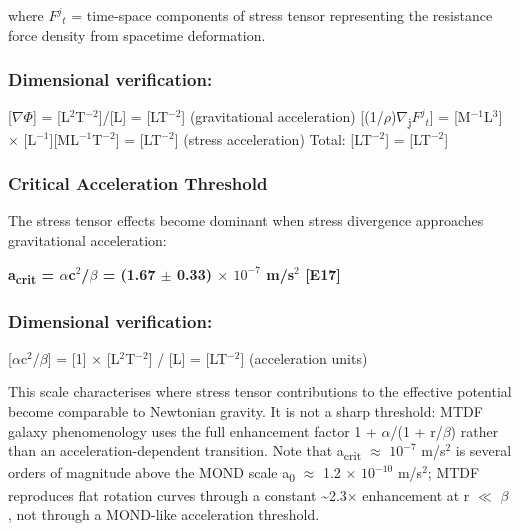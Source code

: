 \documentclass[11pt,a4paper]{article}
\begin{document}
where $F^{j}{}_{t}$ = time-space components of stress tensor representing the resistance force density from spacetime deformation.

\begin{mdframed}[linecolor=accent,linewidth=0.5pt,backgroundcolor=callout-bg,leftline=true,rightline=true,topline=true,bottomline=true,innerleftmargin=8pt,innerrightmargin=8pt,innertopmargin=6pt,innerbottommargin=6pt]
\subsubsection{Dimensional verification:}
[$\nabla$$\Phi$] = [L$^{2}$T$^{-2}$]/[L] = [LT$^{-2}$] (gravitational acceleration)\newline{}
[(1/\allowbreak{}$\rho$)$\nabla$\textsubscript{j}$F^{j}{}_{t}$] = [M$^{-1}$L$^{3}$] $\times$ [L$^{-1}$][ML$^{-1}$T$^{-2}$] = [LT$^{-2}$] (stress acceleration)\newline{}
Total: [LT$^{-2}$] = [LT$^{-2}$] \checkmark{}
\end{mdframed}

\subsubsection{Critical Acceleration Threshold}
The stress tensor effects become dominant when stress divergence approaches gravitational acceleration:

\textbf{a\textsubscript{crit} = $\alpha$c$^{2}$/$\beta$ = (1.67 $\pm$ 0.33) $\times$ $10^{-7}$ m/\allowbreak{}s$^{2}$ [E17]}

\begin{mdframed}[linecolor=accent,linewidth=0.5pt,backgroundcolor=callout-bg,leftline=true,rightline=true,topline=true,bottomline=true,innerleftmargin=8pt,innerrightmargin=8pt,innertopmargin=6pt,innerbottommargin=6pt]
\subsubsection{Dimensional verification:}
[$\alpha$c$^{2}$/$\beta$] = [1] $\times$ [L$^{2}$T$^{-2}$] / [L] = [LT$^{-2}$] \checkmark{} (acceleration units)
\end{mdframed}

This scale characterises where stress tensor contributions to the effective potential become comparable to Newtonian gravity. It is not a sharp threshold: MTDF galaxy phenomenology uses the full enhancement factor 1 + $\alpha$/(1 + r/\allowbreak{}$\beta$) rather than an acceleration-dependent transition. Note that a\textsubscript{crit} $\approx$ $10^{-7}$ m/\allowbreak{}s$^{2}$ is several orders of magnitude above the MOND scale a\textsubscript{0} $\approx$ 1.2 $\times$ $10^{-10}$ m/\allowbreak{}s$^{2}$; MTDF reproduces flat rotation curves through a constant \~{}2.3$\times$ enhancement at r $\ll$ $\beta$, not through a MOND-like acceleration threshold.
\end{document}
